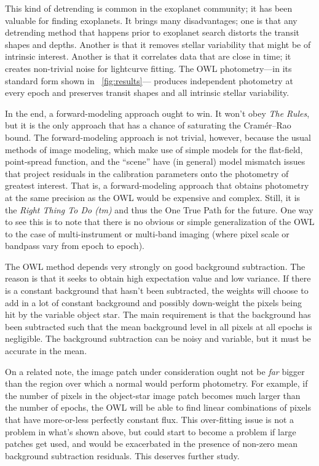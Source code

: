 \documentclass[12pt, letterpaper, preprint]{aastex}
\begin{document}
This kind of detrending is common in the exoplanet community;
  it has been valuable for finding exoplanets.
It brings many disadvantages;
  one is that any detrending method that happens prior to exoplanet search
  distorts the transit shapes and depths.
Another is that it removes stellar variability that might be of intrinsic interest.
Another is that it correlates data that are close in time;
  it creates non-trivial noise for lightcurve fitting.
The OWL photometry---in its standard form shown in \figurename~\ref{fig:results}---%
  produces independent photometry at every epoch
  and preserves transit shapes and all intrinsic stellar variability.

In the end, a forward-modeling approach ought to win.
It won't obey \emph{The Rules}, but it is the only approach that has a chance
  of saturating the Cram\'er--Rao bound.
The forward-modeling approach is not trivial, however,
  because the usual methods of image modeling,
  which make use of simple models for the flat-field, point-spread function,
  and the ``scene''
  have (in general) model mismatch issues that project residuals
  in the calibration parameters onto the photometry of greatest interest.
That is, a forward-modeling approach that obtains photometry at the same
  precision as the OWL would be expensive and complex.
Still, it is the \emph{Right Thing To Do (tm)} and thus the One True Path for the future.
One way to see this is to note that there is no obvious or simple generalization of the OWL
  to the case of multi-instrument or multi-band imaging
  (where pixel scale or bandpass vary from epoch to epoch).

The OWL method depends very strongly on good background subtraction.
The reason is that it seeks to obtain high expectation value and low variance.
If there is a constant background that hasn't been subtracted,
  the weights will choose to add in a lot of constant background
  and possibly down-weight the pixels being hit by the variable object star.
The main requirement is that the background has been subtracted such
  that the mean background level in all pixels at all epochs is negligible.
The background subtraction can be noisy and variable,
  but it must be accurate in the mean.

On a related note, the image patch under consideration ought not be \emph{far}
  bigger than the region over which a normal would perform photometry.
For example, if the number of pixels in the object-star image patch becomes
  much larger than the number of epochs,
  the OWL will be able to find linear combinations of pixels that have
  more-or-less perfectly constant flux.
This over-fitting issue is not a problem in what's shown above,
  but could start to become a problem if large patches get used,
  and would be exacerbated in the presence of non-zero mean background subtraction residuals.
This deserves further study.
\end{document}
